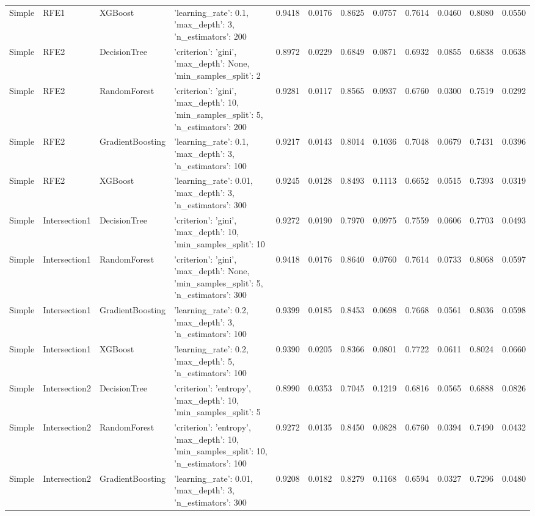 \begin{tabular}{llllrrrrrrrr}
Simple & RFE1 & XGBoost & {'learning_rate': 0.1, 'max_depth': 3, 'n_estimators': 200} & 0.9418 & 0.0176 & 0.8625 & 0.0757 & 0.7614 & 0.0460 & 0.8080 & 0.0550 \\
Simple & RFE2 & DecisionTree & {'criterion': 'gini', 'max_depth': None, 'min_samples_split': 2} & 0.8972 & 0.0229 & 0.6849 & 0.0871 & 0.6932 & 0.0855 & 0.6838 & 0.0638 \\
Simple & RFE2 & RandomForest & {'criterion': 'gini', 'max_depth': 10, 'min_samples_split': 5, 'n_estimators': 200} & 0.9281 & 0.0117 & 0.8565 & 0.0937 & 0.6760 & 0.0300 & 0.7519 & 0.0292 \\
Simple & RFE2 & GradientBoosting & {'learning_rate': 0.1, 'max_depth': 3, 'n_estimators': 100} & 0.9217 & 0.0143 & 0.8014 & 0.1036 & 0.7048 & 0.0679 & 0.7431 & 0.0396 \\
Simple & RFE2 & XGBoost & {'learning_rate': 0.01, 'max_depth': 3, 'n_estimators': 300} & 0.9245 & 0.0128 & 0.8493 & 0.1113 & 0.6652 & 0.0515 & 0.7393 & 0.0319 \\
Simple & Intersection1 & DecisionTree & {'criterion': 'gini', 'max_depth': 10, 'min_samples_split': 10} & 0.9272 & 0.0190 & 0.7970 & 0.0975 & 0.7559 & 0.0606 & 0.7703 & 0.0493 \\
Simple & Intersection1 & RandomForest & {'criterion': 'gini', 'max_depth': None, 'min_samples_split': 5, 'n_estimators': 300} & 0.9418 & 0.0176 & 0.8640 & 0.0760 & 0.7614 & 0.0733 & 0.8068 & 0.0597 \\
Simple & Intersection1 & GradientBoosting & {'learning_rate': 0.2, 'max_depth': 3, 'n_estimators': 100} & 0.9399 & 0.0185 & 0.8453 & 0.0698 & 0.7668 & 0.0561 & 0.8036 & 0.0598 \\
Simple & Intersection1 & XGBoost & {'learning_rate': 0.2, 'max_depth': 5, 'n_estimators': 100} & 0.9390 & 0.0205 & 0.8366 & 0.0801 & 0.7722 & 0.0611 & 0.8024 & 0.0660 \\
Simple & Intersection2 & DecisionTree & {'criterion': 'entropy', 'max_depth': 10, 'min_samples_split': 5} & 0.8990 & 0.0353 & 0.7045 & 0.1219 & 0.6816 & 0.0565 & 0.6888 & 0.0826 \\
Simple & Intersection2 & RandomForest & {'criterion': 'entropy', 'max_depth': 10, 'min_samples_split': 10, 'n_estimators': 100} & 0.9272 & 0.0135 & 0.8450 & 0.0828 & 0.6760 & 0.0394 & 0.7490 & 0.0432 \\
Simple & Intersection2 & GradientBoosting & {'learning_rate': 0.01, 'max_depth': 3, 'n_estimators': 300} & 0.9208 & 0.0182 & 0.8279 & 0.1168 & 0.6594 & 0.0327 & 0.7296 & 0.0480 \\

\end{tabular}
